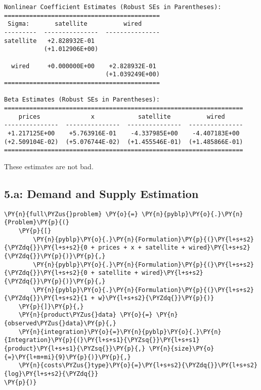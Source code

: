 \begin{Verbatim}[commandchars=\\\{\}]
Nonlinear Coefficient Estimates (Robust SEs in Parentheses):
===========================================
 Sigma:       satellite          wired
---------  ---------------  ---------------
satellite   +2.828932E-01
           (+1.012906E+00)

  wired     +0.000000E+00    +2.828932E-01
                            (+1.039249E+00)
===========================================

Beta Estimates (Robust SEs in Parentheses):
==================================================================
    prices              x            satellite          wired
---------------  ---------------  ---------------  ---------------
 +1.217125E+00    +5.763916E-01    -4.337985E+00    -4.407183E+00
(+2.509104E-02)  (+5.076744E-02)  (+1.455546E-01)  (+1.485866E-01)
==================================================================
    \end{Verbatim}

    These estimates are not bad.

    \hypertarget{a-demand-and-supply-estimation}{%
\subsection{5.a: Demand and Supply
Estimation}\label{a-demand-and-supply-estimation}}

    \begin{tcolorbox}[breakable, size=fbox, boxrule=1pt, pad at break*=1mm,colback=cellbackground, colframe=cellborder]
\begin{Verbatim}[commandchars=\\\{\}]
\PY{n}{full\PYZus{}problem} \PY{o}{=} \PY{n}{pyblp}\PY{o}{.}\PY{n}{Problem}\PY{p}{(}
    \PY{p}{[}
        \PY{n}{pyblp}\PY{o}{.}\PY{n}{Formulation}\PY{p}{(}\PY{l+s+s2}{\PYZdq{}}\PY{l+s+s2}{0 + prices + x + satellite + wired}\PY{l+s+s2}{\PYZdq{}}\PY{p}{)}\PY{p}{,}
        \PY{n}{pyblp}\PY{o}{.}\PY{n}{Formulation}\PY{p}{(}\PY{l+s+s2}{\PYZdq{}}\PY{l+s+s2}{0 + satellite + wired}\PY{l+s+s2}{\PYZdq{}}\PY{p}{)}\PY{p}{,}
        \PY{n}{pyblp}\PY{o}{.}\PY{n}{Formulation}\PY{p}{(}\PY{l+s+s2}{\PYZdq{}}\PY{l+s+s2}{1 + w}\PY{l+s+s2}{\PYZdq{}}\PY{p}{)}
    \PY{p}{]}\PY{p}{,}
    \PY{n}{product\PYZus{}data} \PY{o}{=} \PY{n}{observed\PYZus{}data}\PY{p}{,}
    \PY{n}{integration}\PY{o}{=}\PY{n}{pyblp}\PY{o}{.}\PY{n}{Integration}\PY{p}{(}\PY{l+s+s1}{\PYZsq{}}\PY{l+s+s1}{product}\PY{l+s+s1}{\PYZsq{}}\PY{p}{,} \PY{n}{size}\PY{o}{=}\PY{l+m+mi}{9}\PY{p}{)}\PY{p}{,}
    \PY{n}{costs\PYZus{}type}\PY{o}{=}\PY{l+s+s2}{\PYZdq{}}\PY{l+s+s2}{log}\PY{l+s+s2}{\PYZdq{}}
\PY{p}{)}
\end{Verbatim}
\end{tcolorbox}

